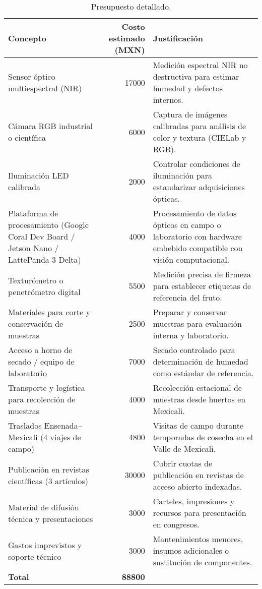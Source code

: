 \begin{table}[h]
\centering
\begin{tabular}{|p{5cm}|r|p{6cm}|}
\hline
\textbf{Concepto} & \textbf{Costo estimado (MXN)} & \textbf{Justificación} \\
\hline
Sensor óptico multiespectral (NIR) & 17000 & Medición espectral NIR no destructiva para estimar humedad y defectos internos. \\
\hline
Cámara RGB industrial o científica & 6000 & Captura de imágenes calibradas para análisis de color y textura (CIELab y RGB). \\
\hline
Iluminación LED calibrada & 2000 & Controlar condiciones de iluminación para estandarizar adquisiciones ópticas. \\
\hline
Plataforma de procesamiento (Google Coral Dev Board / Jetson Nano / LattePanda 3 Delta) & 4000 & Procesamiento de datos ópticos en campo o laboratorio con hardware embebido compatible con visión computacional. \\
\hline
Texturómetro o penetrómetro digital & 5500 & Medición precisa de firmeza para establecer etiquetas de referencia del fruto. \\
\hline
Materiales para corte y conservación de muestras & 2500 & Preparar y conservar muestras para evaluación interna y laboratorio. \\
\hline
Acceso a horno de secado / equipo de laboratorio & 7000 & Secado controlado para determinación de humedad como estándar de referencia. \\
\hline
Transporte y logística para recolección de muestras & 4000 & Recolección estacional de muestras desde huertos en Mexicali. \\
\hline
Traslados Ensenada–Mexicali (4 viajes de campo) & 4800 & Visitas de campo durante temporadas de cosecha en el Valle de Mexicali. \\
\hline
Publicación en revistas científicas (3 artículos) & 30000 & Cubrir cuotas de publicación en revistas de acceso abierto indexadas. \\
\hline
Material de difusión técnica y presentaciones & 3000 & Carteles, impresiones y recursos para presentación en congresos. \\
\hline
Gastos imprevistos y soporte técnico & 3000 & Mantenimientos menores, insumos adicionales o sustitución de componentes. \\
\hline
\textbf{Total} & \textbf{88800} & \\
\hline
\end{tabular}
\caption{Presupuesto detallado.}
\label{tab:presupuesto}
\end{table}

